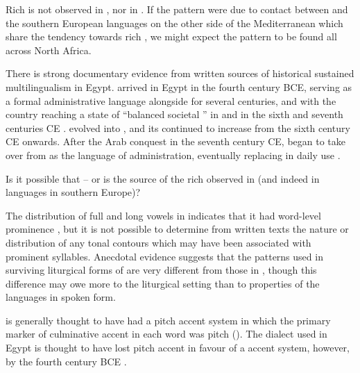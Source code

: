 \documentclass[output=paper]{langsci/langscibook}
\begin{document}
Rich  is not observed in  \citep{Benkirane1998}, nor in  \citep{Hellmuthtoappearbook}. If the   pattern were due to contact between  and the southern European languages on the other side of the Mediterranean which share the tendency towards rich , we might expect the pattern to be found all across North Africa.

There is strong documentary evidence from written sources of historical sustained multilingualism in Egypt.  arrived in Egypt in the fourth century BCE, serving as a formal administrative language alongside  for several centuries, and with the country reaching a state of “balanced societal ” in  and  in the sixth and seventh centuries CE \citep[6]{Papaconstantinou2010}.  evolved into , and its  continued to increase from the sixth century CE onwards. After the Arab conquest in the seventh century CE,  began to take over from  as the language of administration, eventually replacing  in daily use \citep{Papaconstantinou2012}. 

Is it possible that -- or  is the source of the rich  observed in  (and indeed in  languages in southern Europe)? 

The distribution of full and long vowels in  indicates that it had word-level prominence \citep[270]{Peust1999}, but it is not possible to determine from written texts the nature or distribution of any tonal contours which may have been associated with prominent syllables. Anecdotal evidence suggests that the  patterns used in surviving liturgical forms of  are very different from those in  \citep[32]{Peust1999}, though this difference may owe more to the liturgical setting than to properties of the languages in spoken form.

 is generally thought to have had a pitch accent system in which the primary marker of culminative accent in each word was pitch (\citealt{DevineStephens1985}). The  dialect used in Egypt is thought to have lost pitch accent in favour of a  accent system, however, by the fourth century BCE \citep{Benaissa2012}. 
\end{document}
